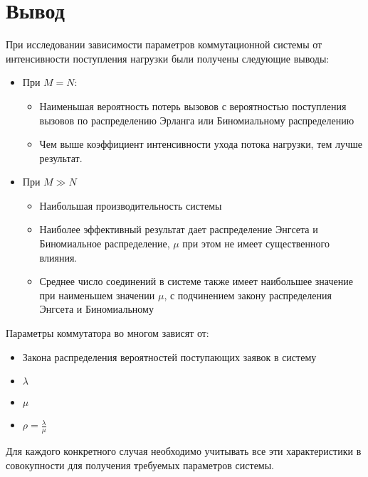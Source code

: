 \documentclass[12pt]{article}
\begin{document}
\section{Вывод}
При исследовании зависимости параметров коммутационной системы от интенсивности поступления нагрузки были получены следующие выводы:
\begin{itemize}
	\item При $M = N$:
	\begin{itemize}
		\item Наименьшая вероятность потерь вызовов с вероятностью поступления вызовов по распределению Эрланга или Биномиальному распределению
		\item Чем выше коэффициент интенсивности ухода потока нагрузки, тем лучше результат.
	\end{itemize}
	\item При $ M ≫ N$
		\begin{itemize}
			\item Наибольшая производительность системы
			\item Наиболее эффективный результат дает распределение Энгсета и Биномиальное распределение, $\mu$ при этом не имеет существенного влияния.
			\item Среднее число соединений в  системе также имеет наибольшее значение при наименьшем значении $\mu$, с подчинением закону распределения Энгсета и Биномиальному
		\end{itemize}
\end{itemize}

Параметры коммутатора во многом зависят от:
\begin{itemize}
	\item Закона распределения вероятностей поступающих заявок в систему
	\item $\lambda$
	\item $\mu$
	\item $\rho = \frac{\lambda}{\mu}$
\end{itemize}
Для каждого конкретного случая необходимо учитывать все эти характеристики в совокупности для получения требуемых параметров системы.
\end{document}
